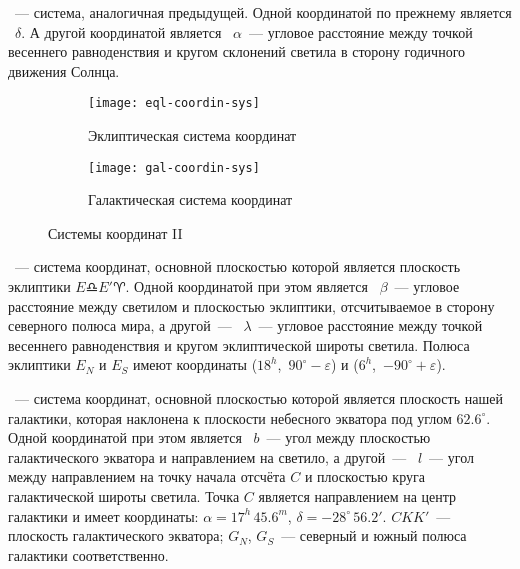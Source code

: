~--- система, аналогичная предыдущей. Одной координатой по прежнему является ~$\delta$. А другой координатой является ~$\alpha$~--- угловое расстояние между точкой весеннего равноденствия и кругом склонений светила в сторону годичного движения Солнца.

\begin{figure}[!h]
	\centering
	\begin{subfigure}{0.49\textwidth}
		\texttt{[image: eql-coordin-sys]}
		\caption{Эклиптическая система координат}
	\end{subfigure}
	\hfill
	\begin{subfigure}{0.49\textwidth}
		\texttt{[image: gal-coordin-sys]}
		\caption{Галактическая система координат}
	\end{subfigure}
	\caption{Системы координат II}
\end{figure}
~--- система координат, основной плоскостью которой является плоскость эклиптики $E \libra E' \aries $. Одной координатой при этом является ~$\beta$~--- угловое расстояние между светилом и плоскостью эклиптики, отсчитываемое в сторону северного полюса мира, а другой~--- ~$\lambda$~--- угловое расстояние между точкой весеннего равноденствия и кругом эклиптической широты светила. Полюса эклиптики $E_N$ и $E_S$ имеют координаты ($18^h$,~$90^\circ - \varepsilon$) и ($6^h$,~$-90^\circ + \varepsilon$).

~--- система координат, основной плоскостью которой является плоскость нашей галактики, которая наклонена к плоскости небесного экватора под углом $62.6^\circ$. Одной координатой при этом является ~$b$~--- угол между плоскостью галактического экватора и направлением на светило, а другой~--- ~$l$~--- угол между направлением на точку начала отсчёта $C$ и плоскостью круга галактической широты светила. Точка $C$ является направлением на центр галактики и имеет координаты: $\alpha=17^h\,45.6^m$, $\delta=-28^{\circ}\,56.2'$. $C K K'$~--- плоскость галактического экватора; $G_N$, $G_S$~--- северный и южный полюса галактики соответственно.
